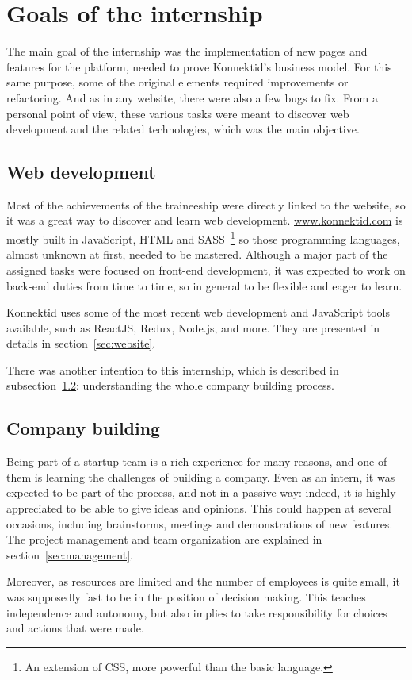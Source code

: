 \section{Goals of the internship}
\label{sec:goals}

The main goal of the internship was the implementation of new pages and features for the platform, needed to prove Konnektid's business model.
For this same purpose, some of the original elements required improvements or refactoring. And as in any website, there were also a few bugs to fix.
From a personal point of view, these various tasks were meant to discover web development and the related technologies, which was the main objective.

\subsection{Web development}
\label{ssec:web}

Most of the achievements of the traineeship were directly linked to the website, so it was a great way to discover and learn web development.
\url{www.konnektid.com} is mostly built in JavaScript, HTML and SASS~\footnote{An extension of CSS, more powerful than the basic language.}
so those programming languages, almost unknown at first, needed to be mastered.
Although a major part of the assigned tasks were focused on front-end development,
it was expected to work on back-end duties from time to time, so in general to be flexible and eager to learn.

Konnektid uses some of the most recent web development and JavaScript tools available, such as ReactJS, Redux, Node.js, and more.
They are presented in details in {\sc section}~\ref{sec:website}.

There was another intention to this internship, which is described in {\sc subsection}~\ref{ssec:companyBuilding}:
understanding the whole company building process.

\subsection{Company building}
\label{ssec:companyBuilding}

Being part of a startup team is a rich experience for many reasons, and one of them is learning the challenges of building a company.
Even as an intern, it was expected to be part of the process, and not in a passive way:
indeed, it is highly appreciated to be able to give ideas and opinions.
This could happen at several occasions, including brainstorms, meetings and demonstrations of new features.
The project management and team organization are explained in {\sc section}~\ref{sec:management}.

Moreover, as resources are limited and the number of employees is quite small, it was supposedly fast to be in the position of decision making.
This teaches independence and autonomy, but also implies to take responsibility for choices and actions that were made.
